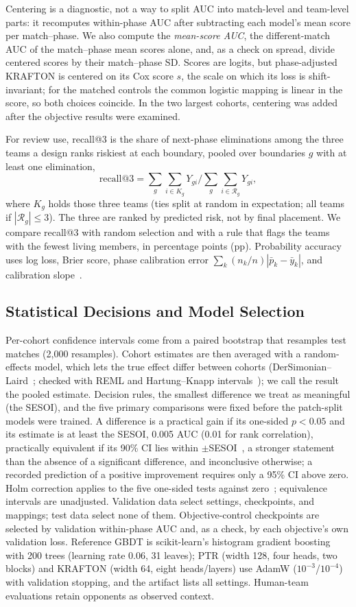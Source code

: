 \documentclass[sigconf,anonymous]{acmart}
\begin{document}
Centering is a diagnostic, not a way to split AUC into match-level and team-level parts: it recomputes within-phase AUC after subtracting each model's mean score per match--phase. We also compute the \emph{mean-score AUC}, the different-match AUC of the match--phase mean scores alone, and, as a check on spread, divide centered scores by their match--phase SD. Scores are logits, but phase-adjusted KRAFTON is centered on its Cox score $s$, the scale on which its loss is shift-invariant; for the matched controls the common logistic mapping is linear in the score, so both choices coincide. In the two largest cohorts, centering was added after the objective results were examined.

For review use, recall@3 is the share of next-phase eliminations among the three teams a design ranks riskiest at each boundary, pooled over boundaries $g$ with at least one elimination,
\[
\mathrm{recall@3}=\sum_g\sum_{i\in K_g}Y_{gi}\Big/\sum_g\sum_{i\in\mathcal{R}_g}Y_{gi},
\]
where $K_g$ holds those three teams (ties split at random in expectation; all teams if $|\mathcal{R}_g|\le3$). The three are ranked by predicted risk, not by final placement. We compare recall@3 with random selection and with a rule that flags the teams with the fewest living members, in percentage points (pp). Probability accuracy uses log loss, Brier score, phase calibration error $\sum_k(n_k/n)|\bar p_k-\bar y_k|$, and calibration slope~\cite{VanCalster16}.

\subsection{Statistical Decisions and Model Selection}
Per-cohort confidence intervals come from a paired bootstrap that resamples test matches (2,000 resamples). Cohort estimates are then averaged with a random-effects model, which lets the true effect differ between cohorts (DerSimonian--Laird~\cite{DerSimonian86}; checked with REML and Hartung--Knapp intervals~\cite{HartungKnapp01}); we call the result the pooled estimate. Decision rules, the smallest difference we treat as meaningful (the SESOI), and the five primary comparisons were fixed before the patch-split models were trained. A difference is a practical gain if its one-sided $p<0.05$ and its estimate is at least the SESOI, 0.005 AUC (0.01 for rank correlation), practically equivalent if its 90\% CI lies within $\pm$SESOI~\cite{Schuirmann87}, a stronger statement than the absence of a significant difference, and inconclusive otherwise; a recorded prediction of a positive improvement requires only a 95\% CI above zero. Holm correction applies to the five one-sided tests against zero~\cite{Holm79}; equivalence intervals are unadjusted. Validation data select settings, checkpoints, and mappings; test data select none of them. Objective-control checkpoints are selected by validation within-phase AUC and, as a check, by each objective's own validation loss. Reference GBDT is scikit-learn's histogram gradient boosting with 200 trees (learning rate 0.06, 31 leaves); PTR (width 128, four heads, two blocks) and KRAFTON (width 64, eight heads/layers) use AdamW ($10^{-3}$/$10^{-4}$) with validation stopping, and the artifact lists all settings. Human-team evaluations retain opponents as observed context.
\end{document}

